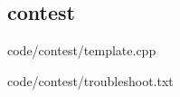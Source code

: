 \documentclass[landscape, 8pt, a4paper, oneside]{extarticle}
\begin{document}
\begin{multicols*}{3}

\maketitlepage



\section{contest}

{code/contest/template.cpp}

{code/contest/troubleshoot.txt}

\end{multicols*}
\end{document}
